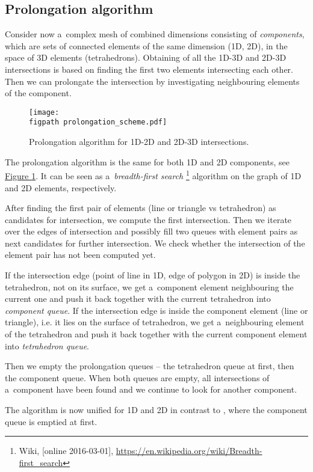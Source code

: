 \documentclass[FM,Dis]{tulthesis}
\newcommand{\fig}[1]{\hyperref[#1]{Figure \ref{#1}}}
\newcommand{\figpath}{figures/}
\begin{document}
\subsection{Prolongation algorithm}
Consider now a~complex mesh of combined dimensions consisting of \emph{components}, which are sets of connected
elements of the same dimension (1D, 2D), in the space of 3D elements (tetrahedrons). 
Obtaining of all the 1D-3D and 2D-3D intersections is based on finding the first two elements intersecting each other.
Then we can prolongate the intersection by investigating neighbouring elements of the component.
%
\begin{figure}[!htb]
  \centering    
    \texttt{[image: \\figpath prolongation\_scheme.pdf]}
  \caption{Prolongation algorithm for 1D-2D and 2D-3D intersections. }
  \label{fig:prolongation}
\end{figure}

The prolongation algorithm is the same for both 1D and 2D components, see \fig{fig:prolongation}. 
It can be seen as a~\emph{breadth-first search}
\footnote{Wiki, [online 2016-03-01], \url{https://en.wikipedia.org/wiki/Breadth-first_search}}
algorithm on the graph of 1D and 2D elements, respectively.

After finding the first pair of elements (line or triangle vs tetrahedron) as candidates for intersection, 
we compute the first intersection. Then we iterate over the edges of intersection and possibly fill two queues 
with element pairs as next candidates for further intersection. We check whether the intersection of the element pair
has not been computed yet.

If the intersection edge (point of line in 1D, edge of polygon in 2D) is inside the tetrahedron, not on its surface, we
get a~component element neighbouring the current one and push it back together with the current tetrahedron into 
\emph{component queue}. If the intersection edge is inside the component element 
(line or triangle), i.e. it lies on the surface of tetrahedron, we get a~neighbouring element of the tetrahedron
and push it back together with the current component element into \emph{tetrahedron queue}.

Then we empty the prolongation queues -- the tetrahedron queue at first, then the component queue.
When both queues are empty, all intersections of a~component have been found and we continue to look for
another component.

The algorithm is now unified for 1D and 2D in contrast to \cite{fris_dp_2015}, where the component
queue is emptied at first.
\end{document}
